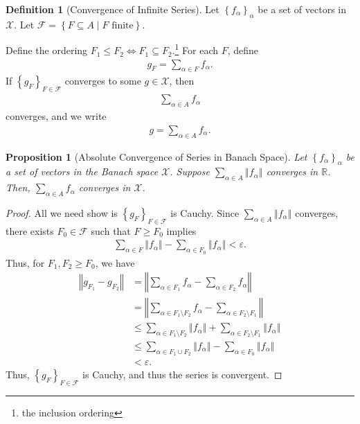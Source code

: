 \documentclass[12pt]{extarticle}
\newcommand{\R}{\mathbb{R}}
\newcommand{\norm}[1]{\left\Vert #1\right\Vert}
\newcommand{\set}[1]{\left\{#1\right\}}
\newcommand{\ve}{\varepsilon}
\theoremstyle{plain}
\newtheorem*{proposition}{Proposition}
\theoremstyle{definition}
\newtheorem*{definition}{Definition}
\theoremstyle{note}
\renewcommand{\newline}{\hfill\break}
\begin{document}
\begin{definition}[Convergence of Infinite Series]
  Let $\set{f_{\alpha}}_{\alpha}$ be a set of vectors in $\mathcal{X}$. Let $\mathcal{F} = \set{F\subseteq A\mid F\text{ finite}}$.\newline

  Define the ordering $F_1\leq F_2 \Leftrightarrow F_1 \subseteq F_2$.\footnote{the inclusion ordering} For each $F$, define
  \begin{align*}
    g_F = \sum_{\alpha \in F}f_{\alpha}.
  \end{align*}
  If $\set{g_F}_{F\in \mathcal{F}}$ converges to some $g\in \mathcal{X}$, then
  \begin{align*}
    \sum_{\alpha \in A}f_{\alpha}
  \end{align*}
  converges, and we write
  \begin{align*}
    g = \sum_{\alpha \in A}f_{\alpha}.
  \end{align*}
\end{definition}
\begin{proposition}[Absolute Convergence of Series in Banach Space]
  Let $\set{f_{\alpha}}_{\alpha}$ be a set of vectors in the Banach space $\mathcal{X}$. Suppose $\displaystyle \sum_{\alpha \in A}\norm{f_{\alpha}}$ converges in $\R$. Then, $\sum_{\alpha \in A}f_{\alpha}$ converges in $\mathcal{X}$.
\end{proposition}
\begin{proof}
  All we need show is $\set{g_{F}}_{F\in \mathcal{F}}$ is Cauchy. Since $\displaystyle \sum_{\alpha \in A}\norm{f_{\alpha}}$ converges, there exists $F_0\in \mathcal{F}$ such that $F\geq F_{0}$ implies
  \begin{align*}
    \sum_{\alpha \in F} \norm{f_{\alpha}} - \sum_{\alpha \in F_{0}}\norm{f_{\alpha}} < \ve.
  \end{align*}
  Thus, for $F_1,F_2 \geq F_0$, we have
  \begin{align*}
    \norm{g_{F_1} - g_{F_2}} &= \norm{\sum_{\alpha \in F_1}f_{\alpha} - \sum_{\alpha \in F_2}f_{\alpha}}\\
                             &= \norm{\sum_{\alpha \in F_1\setminus F_2}f_{\alpha} - \sum_{\alpha \in F_2\setminus F_1}}\\
                             &\leq \sum_{\alpha \in F_{1}\setminus F_2} \norm{f_{\alpha}} + \sum_{\alpha \in F_2\setminus F_1}\norm{f_{\alpha}}\\
                             &\leq \sum_{\alpha \in F_1\cup F_2}\norm{f_{\alpha}} - \sum_{\alpha \in F_0}\norm{f_{\alpha}}\\
                             &< \ve.
  \end{align*}
  Thus, $\set{g_{F}}_{F\in \mathcal{F}}$ is Cauchy, and thus the series is convergent.
\end{proof}
\end{document}
